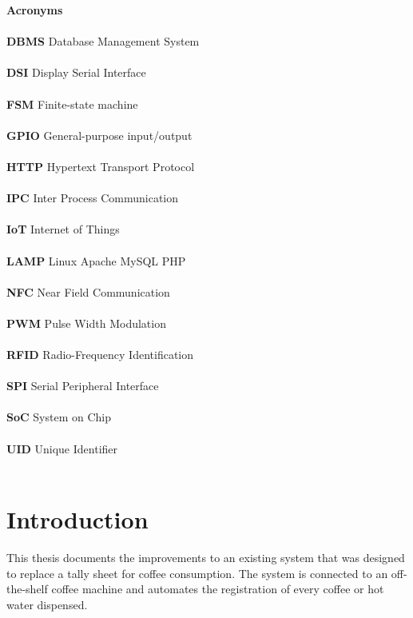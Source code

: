 \documentclass[12pt]{article}
\begin{document}
\listoffigures
\clearpage
\begingroup
\pagestyle{empty}
\null
\newpage
\endgroup
\noindent
\textbf{ \LARGE{Acronyms}} \\~\\
\textbf{DBMS} Database Management System\\~\\
\textbf{DSI} Display Serial Interface\\~\\
\textbf{FSM} Finite-state machine\\~\\
\textbf{GPIO} General-purpose input/output\\~\\
\textbf{HTTP} Hypertext Transport Protocol \\~\\
\textbf{IPC} Inter Process Communication \\~\\
\textbf{IoT} Internet of Things \\~\\
\textbf{LAMP} Linux Apache MySQL PHP \\~\\
\textbf{NFC} Near Field Communication\\~\\
\textbf{PWM} Pulse Width Modulation \\~\\
\textbf{RFID} Radio-Frequency Identification\\~\\
\textbf{SPI} Serial Peripheral Interface\\~\\
\textbf{SoC} System on Chip \\~\\
\textbf{UID} Unique Identifier \\~\\
\clearpage
\begingroup
\pagestyle{empty}
\null
\newpage
\endgroup


\section{Introduction}
This thesis documents the improvements to an existing system that was designed to replace a tally sheet for coffee consumption.
The system is connected to an off-the-shelf coffee machine and
automates the registration of every coffee or hot water dispensed.
\end{document}
